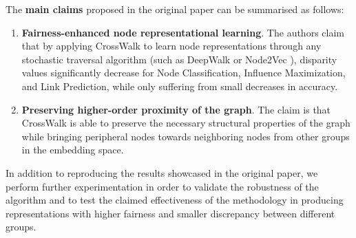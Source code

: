 The \textbf{main claims} proposed in the original paper can be summarised as follows:

\begin{enumerate}
    \item \textbf{Fairness-enhanced node representational learning}. The authors claim that by applying CrossWalk to learn node representations through any stochastic traversal algorithm (such as DeepWalk \cite{deepwalk} or Node2Vec \cite{node2vec}), disparity values significantly decrease for Node Classification, Influence Maximization, and Link Prediction, while only suffering from small decreases in accuracy.
    
    \item \textbf{Preserving higher-order proximity of the graph}. The claim is that CrossWalk is able to preserve the necessary structural properties of the graph while bringing peripheral nodes towards neighboring nodes from other groups in the embedding space.
\end{enumerate}
\vspace{-1mm}



In addition to reproducing the results showcased in the original paper, we perform further experimentation in order to validate the robustness of the algorithm and to test the claimed effectiveness of the methodology in producing representations with higher fairness and smaller discrepancy between different groups. 






